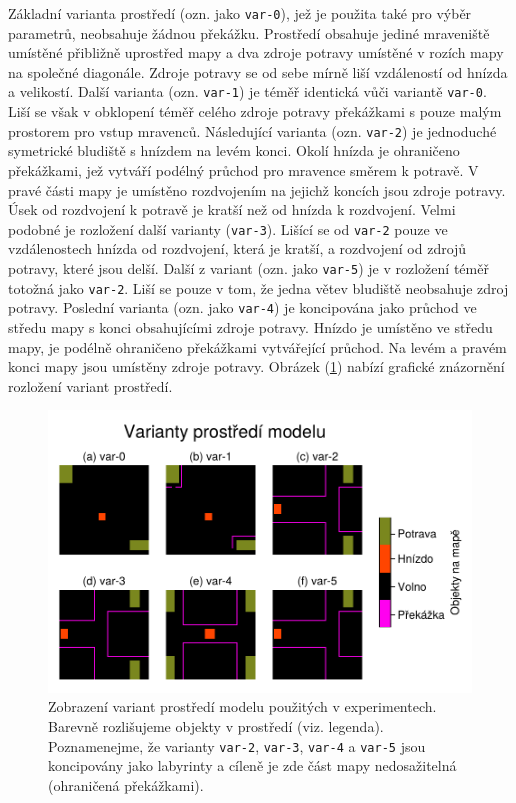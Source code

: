 \documentclass[10pt,a4paper,twocolumn]{article}
\begin{document}
Základní varianta prostředí (ozn. jako \texttt{var-0}), jež je použita 
také pro výběr parametrů, neobsahuje žádnou překážku. Prostředí obsahuje 
jediné mraveniště umístěné přibližně uprostřed mapy a dva zdroje potravy
umístěné v rozích mapy na společné diagonále. Zdroje potravy se od sebe 
mírně liší vzdáleností od hnízda a velikostí. Další varianta 
(ozn. \texttt{var-1}) je téměř identická vůči variantě
\texttt{var-0}. Liší se však v obklopení téměř celého zdroje
potravy překážkami s pouze malým prostorem pro vstup mravenců. Následující
varianta (ozn. \texttt{var-2}) je jednoduché symetrické bludiště s hnízdem 
na levém konci. Okolí hnízda je ohraničeno překážkami, jež vytváří podélný 
průchod pro mravence směrem k potravě. V pravé části mapy je umístěno 
rozdvojením na jejichž koncích jsou zdroje potravy. Úsek od rozdvojení
k potravě je kratší než od hnízda k rozdvojení. Velmi podobné je rozložení
další varianty (\texttt{var-3}). Lišící se od \texttt{var-2} pouze ve 
vzdálenostech hnízda od rozdvojení, která je kratší, a rozdvojení od 
zdrojů potravy, které jsou delší. Další z variant (ozn. jako \texttt{var-5})
je v rozložení téměř totožná jako \texttt{var-2}. Liší se pouze v tom, že 
jedna větev bludiště neobsahuje zdroj potravy. Poslední varianta (ozn. jako
\texttt{var-4}) je koncipována jako průchod ve středu mapy s konci 
obsahujícími zdroje potravy. Hnízdo je umístěno ve středu mapy, je 
podélně ohraničeno překážkami vytvářející průchod. Na levém a pravém konci
mapy jsou umístěny zdroje potravy. Obrázek (\ref{fig:map_variants})
nabízí grafické znázornění rozložení variant prostředí.
 

\begin{figure}[tb]
  \centering
  \includegraphics[width=0.98\linewidth]{images/maze_variants.pdf}
  \caption{Zobrazení variant prostředí modelu použitých v experimentech. 
  Barevně rozlišujeme objekty v prostředí (viz. legenda). 
  Poznamenejme, že varianty \texttt{var-2}, \texttt{var-3}, 
  \texttt{var-4} a \texttt{var-5} jsou koncipovány jako labyrinty a 
  cíleně je zde část mapy nedosažitelná (ohraničená překážkami).}
  \label{fig:map_variants}
\end{figure} 
\end{document}

